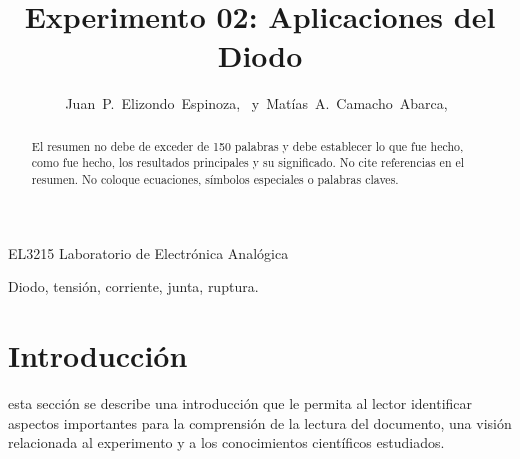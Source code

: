 \documentclass[journal]{IEEEtran}
\begin{document}
%
\title{Experimento 02: Aplicaciones del Diodo}


\author{Juan~P.~Elizondo~Espinoza,~
        y~Matías~A.~Camacho~Abarca,~
}


%
{EL3215 Laboratorio de Electrónica Analógica}


\maketitle


\begin{abstract}
El resumen no debe de exceder de 150 palabras y debe establecer lo que fue hecho, como fue hecho, los resultados principales y su significado. No cite referencias en el resumen. No coloque ecuaciones, símbolos especiales o palabras claves.
\end{abstract}

\begin{IEEEkeywords}
Diodo, tensión, corriente, junta, ruptura.
\end{IEEEkeywords}


\section{Introducción}

 esta sección se describe una introducción que le permita al lector identificar aspectos importantes para la comprensión de la lectura del documento, una visión relacionada al experimento y a los conocimientos científicos estudiados.


\end{document}
